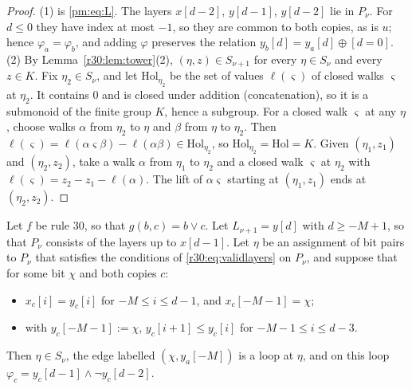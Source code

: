 \begin{proof}
(1) is \eqref{pm:eq:L}. The layers $x[d-2]$, $y[d-1]$, $y[d-2]$ lie in $P_\nu$. For $d\le0$ they have index at most $-1$, so they are common to both copies, as is $u$; hence $\varphi_a=\varphi_b$, and adding $\varphi$ preserves the relation $y_b[d]=y_a[d]\oplus[d=0]$.
(2) By Lemma~\ref{r30:lem:tower}(2), $(\eta,z)\in S_{\nu+1}$ for every $\eta\in S_\nu$ and every $z\in K$. Fix $\eta_2\in S_\nu$, and let $\mathrm{Hol}_{\eta_2}$ be the set of values $\ell(\varsigma)$ of closed walks $\varsigma$ at $\eta_2$. It contains $0$ and is closed under addition (concatenation), so it is a submonoid of the finite group $K$, hence a subgroup. For a closed walk $\varsigma$ at any $\eta$, choose walks $\alpha$ from $\eta_2$ to $\eta$ and $\beta$ from $\eta$ to $\eta_2$. Then $\ell(\varsigma)=\ell(\alpha\varsigma\beta)-\ell(\alpha\beta)\in\mathrm{Hol}_{\eta_2}$, so $\mathrm{Hol}_{\eta_2}=\mathrm{Hol}=K$. Given $(\eta_1,z_1)$ and $(\eta_2,z_2)$, take a walk $\alpha$ from $\eta_1$ to $\eta_2$ and a closed walk $\varsigma$ at $\eta_2$ with $\ell(\varsigma)=z_2-z_1-\ell(\alpha)$. The lift of $\alpha\varsigma$ starting at $(\eta_1,z_1)$ ends at $(\eta_2,z_2)$.
\end{proof}

\begin{lemma}\label{r30:lem:stationary}
Let $f$ be rule $30$, so that $g(b,c)=b\vee c$. Let $L_{\nu+1}=y[d]$ with $d\ge-M+1$, so that $P_\nu$ consists of the layers up to $x[d-1]$. Let $\eta$ be an assignment of bit pairs to $P_\nu$ that satisfies the conditions of \eqref{r30:eq:validlayers} on $P_\nu$, and suppose that for some bit $\chi$ and both copies $c$:
\begin{itemize}
\item $x_c[i]=y_c[i]$ for $-M\le i\le d-1$, and $x_c[-M-1]=\chi$;
\item with $y_c[-M-1]:=\chi$, $y_c[i+1]\le y_c[i]$ for $-M-1\le i\le d-3$.
\end{itemize}
Then $\eta\in S_\nu$, the edge labelled $(\chi,y_a[-M])$ is a loop at $\eta$, and on this loop $\varphi_c=y_c[d-1]\wedge\neg y_c[d-2]$.
\end{lemma}


